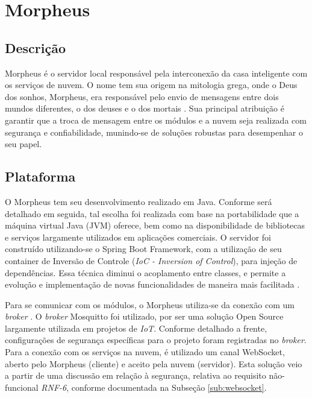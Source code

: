 \section{Morpheus \label{chap:morpheus}}

\subsection{Descrição}
Morpheus é o servidor local responsável pela interconexão da casa inteligente com os serviços de nuvem. O nome tem sua origem na mitologia grega, onde o Deus dos sonhos, Morpheus, era responsável pelo envio de mensagens entre dois mundos diferentes, o dos deuses e o dos mortais \cite{morpheusName}. Sua principal atribuição é garantir que a troca de mensagem entre os módulos e a nuvem seja realizada com segurança e confiabilidade, munindo-se de soluções robustas para desempenhar o seu papel.

\subsection{Plataforma}
O Morpheus tem seu desenvolvimento realizado em Java. Conforme será detalhado em seguida, tal escolha foi realizada com base na portabilidade que a máquina virtual Java (JVM) oferece, bem como na disponibilidade de bibliotecas e serviços largamente utilizados em aplicações comerciais. O servidor foi construído utilizando-se o Spring Boot Framework, com a utilização de seu container de Inversão de Controle (\emph{IoC - Inversion of Control}), para injeção de dependências. Essa técnica diminui o acoplamento entre classes, e permite a evolução e implementação de novas funcionalidades de maneira mais facilitada \cite{iocFowler}.

Para se comunicar com os módulos, o Morpheus utiliza-se da conexão com um \emph{broker} \wmqtt{}. O \emph{broker} Mosquitto foi utilizado, por ser uma solução Open Source largamente utilizada em projetos de \emph{IoT}. Conforme detalhado a frente, configurações de segurança específicas para o projeto foram registradas no \emph{broker}. Para a conexão com os serviços na nuvem, é utilizado um canal WebSocket, aberto pelo Morpheus (cliente) e aceito pela nuvem (servidor). Esta solução veio a partir de uma discussão em relação à segurança, relativa ao requisito não-funcional \emph{RNF-6}, conforme documentada na Subseção \ref{sub:websocket}.

